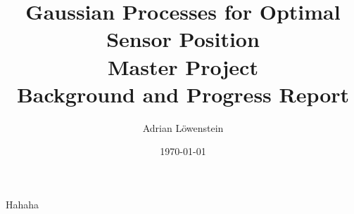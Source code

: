 \documentclass[11pt,a4paper]{article}
\title{Gaussian Processes for Optimal Sensor Position \\
Master Project \\
Background and Progress Report 
}							%
\author{Adrian Löwenstein}								%
\date{\today}											%
\numberwithin{equation}{section}
\begin{document}
\maketitle

\pagebreak

Hahaha
\end{document}
